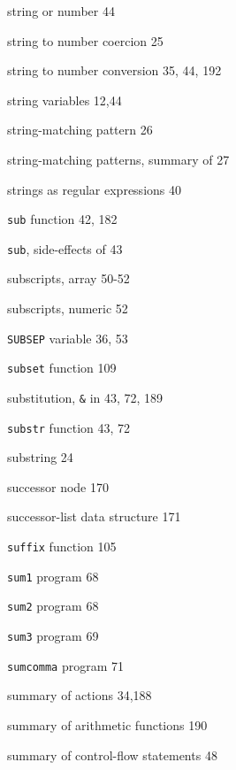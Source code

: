 \begin{multicols}{3}
\hangindent=3pc  string or number 44

\hangindent=3pc  string to number coercion 25

\hangindent=3pc  string to number conversion 35, 44, 192

\hangindent=3pc  string variables 12,44

\hangindent=3pc  string-matching pattern 26

\hangindent=3pc  string-matching patterns, summary of 27

\hangindent=3pc  strings as regular expressions 40

\hangindent=3pc  \verb'sub' function 42, 182

\hangindent=3pc  \verb'sub', side-effects of 43

\hangindent=3pc  subscripts, array 50-52

\hangindent=3pc  subscripts, numeric 52

\hangindent=3pc  \verb'SUBSEP' variable 36, 53

\hangindent=3pc  \verb'subset' function 109

\hangindent=3pc  substitution, \verb'&' in 43, 72, 189

\hangindent=3pc  \verb'substr' function 43, 72

\hangindent=3pc  substring 24

\hangindent=3pc  successor node 170

\hangindent=3pc  successor-list data structure 171

\hangindent=3pc  \verb'suffix' function 105







\hangindent=3pc  \verb'sum1' program 68

\hangindent=3pc  \verb'sum2' program 68

\hangindent=3pc  \verb'sum3' program 69

\hangindent=3pc  \verb'sumcomma' program 71

\hangindent=3pc  summary of actions 34,188

\hangindent=3pc  summary of arithmetic functions 190

\hangindent=3pc  summary of control-flow statements 48


\end{multicols}
